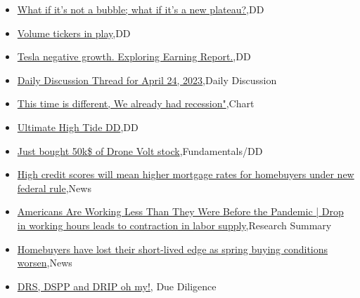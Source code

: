 \documentclass{article}%
\begin{document}
%
\begin{itemize}%
\item%
\href{https://reddit.com/r/wallstreetbets/comments/12xdm99/what\_if\_its\_not\_a\_bubble\_what\_if\_its\_a\_new\_plateau/}{What if it's not a bubble; what if it's a new plateau?},DD%
\item%
\href{https://reddit.com/r/wallstreetbets/comments/12xdbv7/volume\_tickers\_in\_play/}{Volume tickers in play},DD%
\item%
\href{https://reddit.com/r/wallstreetbets/comments/12xb7qn/tesla\_negative\_growth\_exploring\_earning\_report/}{Tesla negative growth. Exploring Earning Report.},DD%
\item%
\href{https://reddit.com/r/wallstreetbets/comments/12xagjv/daily\_discussion\_thread\_for\_april\_24\_2023/}{Daily Discussion Thread for April 24, 2023},Daily Discussion%
\item%
\href{https://reddit.com/r/wallstreetbets/comments/12xa35s/this\_time\_is\_different\_we\_already\_had\_recession/}{This time is different, We already had recession"},Chart%
\item%
\href{https://reddit.com/r/Baystreetbets/comments/12x8izc/ultimate\_high\_tide\_dd/}{Ultimate High Tide DD},DD%
\item%
\href{https://reddit.com/r/StockMarket/comments/12xan3c/just\_bought\_50k\_of\_drone\_volt\_stock/}{Just bought 50k\$ of Drone Volt stock},Fundamentals/DD%
\item%
\href{https://reddit.com/r/Economics/comments/12x2q02/high\_credit\_scores\_will\_mean\_higher\_mortgage/}{High credit scores will mean higher mortgage rates for homebuyers under new federal rule},News%
\item%
\href{https://reddit.com/r/Economics/comments/12wslsf/americans\_are\_working\_less\_than\_they\_were\_before/}{Americans Are Working Less Than They Were Before the Pandemic | Drop in working hours leads to contraction in labor supply},Research Summary%
\item%
\href{https://reddit.com/r/Economics/comments/12wp3ch/homebuyers\_have\_lost\_their\_shortlived\_edge\_as/}{Homebuyers have lost their short-lived edge as spring buying conditions worsen},News%
\item%
\href{https://reddit.com/r/Superstonk/comments/12xeksa/drs\_dspp\_and\_drip\_oh\_my/}{DRS, DSPP and DRIP oh my!}, Due Diligence%
\end{itemize}%
\end{document}
